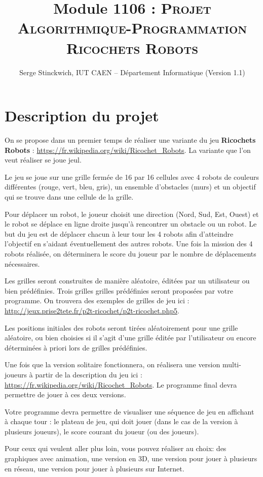 \documentclass[10pt]{article}
\title{Module 1106 : \textsc{Projet Algorithmique-Programmation \\ Ricochets Robots}}
\author{Serge Stinckwich, IUT CAEN -- Département Informatique (Version 1.1)}
\begin{document}
\maketitle

\pagestyle{empty}

\section{Description du projet}

On se propose dans un premier temps de réaliser une variante du jeu {\bf Ricochets Robots} : \url{https://fr.wikipedia.org/wiki/Ricochet_Robots}. La variante que l'on veut réaliser se joue jeul.

Le jeu se joue sur une grille fermée de 16 par 16 cellules avec 4 robots de couleurs différentes (rouge, vert,
bleu, gris), un ensemble d'obstacles (murs) et un objectif qui se trouve dans une cellule de la grille.

Pour déplacer un robot, le joueur choisit une direction (Nord, Sud, Est, Ouest) et le robot
se déplace en ligne droite jusqu'à rencontrer un obstacle ou un robot. Le but du jeu
est de déplacer chacun à leur tour les 4 robots afin d'atteindre l'objectif en s'aidant éventuellement des autres robots. Une fois la mission des 4 robots réalisée, on déterminera le score du joueur par le nombre de déplacements nécessaires.

Les grilles seront construites de manière aléatoire, éditées par un utilisateur ou bien prédéfinies. 
Trois grilles grilles prédéfinies seront proposées par votre programme. On trouvera des exemples de grilles de jeu ici :
\url{http://jeux.prise2tete.fr/p2t-ricochet/p2t-ricochet.php5}.

Les positions initiales des robots seront tirées aléatoirement pour une grille aléatoire, ou bien choisies si il s'agit d'une grille éditée par l'utilisateur ou encore déterminées à priori lors de grilles prédéfinies.

 Une fois que la version solitaire fonctionnera, on réalisera une version multi-joueurs à partir de la description du jeu ici :
\url{https://fr.wikipedia.org/wiki/Ricochet_Robots}. Le programme final devra permettre de jouer à ces deux versions.

Votre programme devra permettre de visualiser une séquence de jeu en affichant à chaque tour : le plateau de jeu, qui doit jouer (dans le cas de la version à plusieurs joueurs), le score courant du joueur (ou des joueurs).

Pour ceux qui veulent aller plus loin, vous pouvez réaliser au choix: des graphiques avec animation, une version en 3D, une version pour jouer à plusieurs en réseau, une version pour jouer à plusieurs sur Internet.
\end{document}
